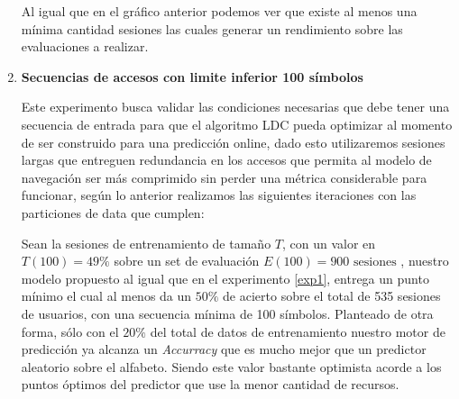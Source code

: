 \begin{enumerate}
	Al igual que en el gráfico anterior podemos ver que existe al menos una mínima cantidad sesiones las cuales generar un rendimiento sobre las evaluaciones a realizar. 








	\item \label{exp5}
	\textbf{Secuencias de accesos con limite inferior 100 símbolos }
	
	Este experimento busca validar las condiciones necesarias que debe tener una secuencia de entrada para que el algoritmo LDC pueda optimizar al momento de ser construido para una predicción online, dado esto utilizaremos sesiones largas que entreguen redundancia en los accesos que permita al modelo de navegación ser más comprimido sin perder una métrica considerable para funcionar, según lo anterior realizamos las siguientes iteraciones con las particiones de data que cumplen: 
	
	
	
	Sean la sesiones de entrenamiento de tamaño $T$, con un valor en $T(100) = 49 \% $ sobre un set de evaluación $E(100) = 900 \mbox{ sesiones}$ , nuestro modelo propuesto al igual que en el experimento \ref{exp1}, entrega un punto mínimo el cual al menos da un $50\%$ de acierto sobre el total de 535 sesiones de usuarios, con una secuencia mínima de 100 símbolos. Planteado de otra forma, sólo con el $20\%$ del total de datos de entrenamiento nuestro motor de predicción ya alcanza un \emph{Accurracy} que es mucho mejor que un predictor aleatorio sobre el alfabeto. Siendo este valor bastante optimista acorde a los puntos óptimos del predictor que use la menor cantidad de recursos.
	
	



\end{enumerate}
